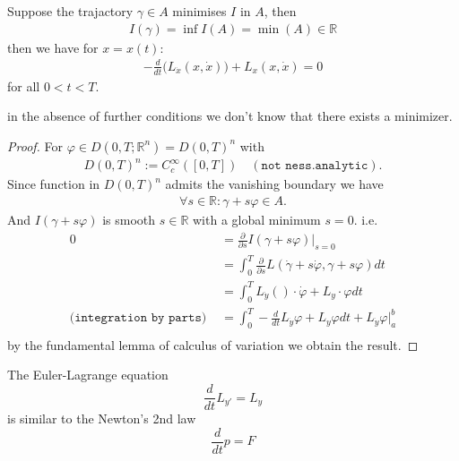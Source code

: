 \begin{theorem}
	Suppose the trajactory $\gamma \in A$ minimises $I$ in $A$, then 
	\begin{align*}
		I(\gamma) = \inf I(A) = \min (A) \in \mathbb{R}
	\end{align*}
	then we have for $x = x(t)$:
	\begin{align*}
		-\frac{d}{d t}\bigg(L_{\dot{x}}(x, \dot{x})\bigg) + L_x(x, \dot{x}) = 0
	\end{align*}
	for all $0 < t< T$. 
\end{theorem}
\begin{remark}
in the absence of further conditions we don't know that there exists a minimizer. 
\end{remark}
\begin{proof}
	For $\varphi \in D(0, T; \mathbb{R}^n) = D(0, T)^n$ with
	\begin{align*}
		D(0, T)^n:=   C^\infty_c([0, T])
		\quad(\texttt{not ness.analytic}).
	\end{align*} 
	Since function in $D(0, T)^n$ admits the vanishing boundary we have
	\begin{align*}
		\forall s \in \mathbb{R}: \gamma + s \varphi \in A.
	\end{align*}
	And $I(\gamma + s \varphi)$ is smooth $s \in \mathbb{R}$ with a global minimum $s = 0$. i.e.
	\begin{align*}
		0&= \frac{\partial}{\partial s }I( \gamma + s \varphi)|_{s = 0}\\
		&= \int_0^T \frac{\partial}{\partial s }L (\dot{\gamma} + s \dot{\varphi}, \gamma + s \varphi) dt\\
		&= \int_0^T L_{\dot{y}}()\cdot  \dot{\varphi} + L_y \cdot  \varphi dt\\
		\texttt{(integration by parts) }
		&= \int_0^T -  \frac{d}{dt} L_{\dot{y}} \varphi + L_y \varphi dt + L_{\dot{y}} \varphi |_a^b\\
	\end{align*}
	by the fundamental lemma of calculus of variation we obtain the result. 
\end{proof}
\begin{remark}
The Euler-Lagrange equation 
\begin{equation}
	\frac{d}{dt}L_{y'} = L_y
\end{equation}
is similar to the Newton's 2nd law
\begin{equation}
	\frac{d}{dt} p = F
\end{equation}
\end{remark}


